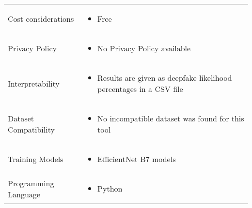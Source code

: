 \begin{table}[htpb]
\begin{tabularx}{\textwidth}{l X}
		\addlinespace
		Cost considerations          & \begin{itemize}
			                               \item Free
		                               \end{itemize}                                                                     \\
		\addlinespace
		Privacy Policy               & \begin{itemize}
			                               \item No Privacy Policy available
		                               \end{itemize}                                                   \\
		\addlinespace
		Interpretability             & \begin{itemize}
			                               \item Results are given as deepfake likelihood percentages in a \ac{CSV} file
		                               \end{itemize}       \\
		\addlinespace
		Dataset Compatibility        & \begin{itemize}
			                               \item No incompatible dataset was found for this tool
		                               \end{itemize}                               \\
		\addlinespace
		Training Models              & \begin{itemize}
			                               \item EfficientNet B7 models
		                               \end{itemize}                                                        \\
		\addlinespace
		Programming Language         & \begin{itemize}
			                               \item Python
		                               \end{itemize}                                                                     \\
		\bottomrule
	\end{tabularx}
\end{table}

